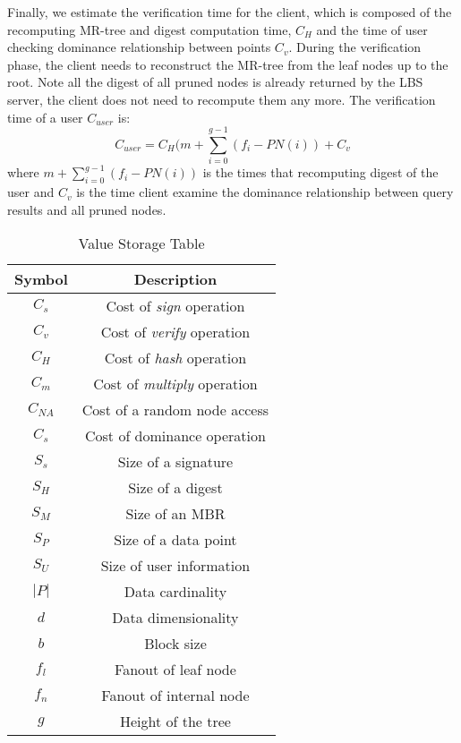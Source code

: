 \documentclass[10pt, conference, compsocconf]{IEEEtran}
\begin{document}
Finally, we estimate the verification time for the client, which is composed of the recomputing MR-tree and digest computation time, $C_H$ and the time of user checking dominance relationship between points $C_v$. During the verification phase, the client needs to reconstruct the MR-tree from the leaf nodes up to the root. Note all the digest of all pruned nodes is already returned by the LBS server, the client does not need to recompute them any more. The verification time of a user $C_{user}$ is:
\begin{equation*}
C_{user} = C_H(m+\sum\limits_{i=0}^{g-1}(f_i - PN(i)) + C_v
\end{equation*}
where $m+\sum\limits_{i=0}^{g-1}(f_i - PN(i))$ is the times that recomputing digest of the user and  $C_v$ is the time client examine the dominance relationship between query results and all pruned nodes.

\begin{table}
	\begin{center}\scriptsize
		\begin{tabular}{c | c}
			\hline
			Symbol & Description \\
			\hline
			$C_s$ & Cost of \emph{sign} operation \\
			$C_v$ & Cost of \emph{verify} operation \\
			$C_H$ & Cost of \emph{hash} operation  \\
			$C_m$ & Cost of \emph{multiply} operation \\
			$C_{NA}$ & Cost of a random node access \\	
			$C_s$ & Cost of dominance operation \\
			$S_{s}$ & Size of a signature \\
			$S_{H}$ & Size of a digest \\
			$S_{M}$ & Size of an MBR \\
			$S_{P}$ & Size of a data point  \\
			$S_{U}$ & Size of user information \\
			$|P|$ & Data cardinality \\
			$d$   & Data dimensionality \\
			$b$   & Block size  \\
			$f_l$   & Fanout of leaf node  \\
			$f_n$   & Fanout of internal node \\
			$g$   & Height of the tree \\
			\hline
		\end{tabular}
	\end{center}
	\caption{Value Storage Table}\label{Symbol2}
\end{table}
\end{document}
